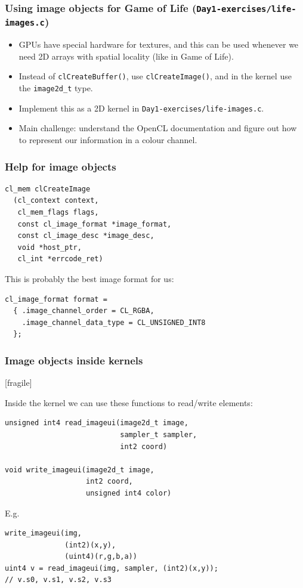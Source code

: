 \documentclass{beamer}
\begin{document}
\begin{frame}
  \frametitle{Using image objects for Game of Life (\texttt{Day1-exercises/life-images.c})}

  \begin{itemize}
  \item GPUs have special hardware for textures, and this can be used
    whenever we need 2D arrays with spatial locality (like in Game of
    Life).

  \item Instead of \texttt{clCreateBuffer()}, use
    \texttt{clCreateImage()}, and in the kernel use the
    \texttt{image2d\_t} type.

  \item Implement this as a 2D kernel in
    \texttt{Day1-exercises/life-images.c}.

  \item Main challenge: understand the OpenCL documentation and figure
    out how to represent our information in a colour channel.
  \end{itemize}
\end{frame}

\begin{frame}
  \frametitle{Help for image objects}

\begin{lstlisting}[backgroundcolor=\color{lightgray}]
cl_mem clCreateImage
  (cl_context context,
   cl_mem_flags flags,
   const cl_image_format *image_format,
   const cl_image_desc *image_desc,
   void *host_ptr,
   cl_int *errcode_ret)
\end{lstlisting}

  This is probably the best image format for us:

\begin{lstlisting}
cl_image_format format =
  { .image_channel_order = CL_RGBA,
    .image_channel_data_type = CL_UNSIGNED_INT8
  };
\end{lstlisting}

\end{frame}

\begin{frame}[fragile]
  \frametitle{Image objects inside kernels}[fragile]

Inside the kernel we can use these functions to read/write elements:

\begin{lstlisting}
unsigned int4 read_imageui(image2d_t image,
                           sampler_t sampler,
                           int2 coord)

void write_imageui(image2d_t image,
                   int2 coord,
                   unsigned int4 color)
\end{lstlisting}

E.g.

\begin{lstlisting}
write_imageui(img,
              (int2)(x,y),
              (uint4)(r,g,b,a))
uint4 v = read_imageui(img, sampler, (int2)(x,y));
// v.s0, v.s1, v.s2, v.s3
\end{lstlisting}

\end{frame}
\end{document}
